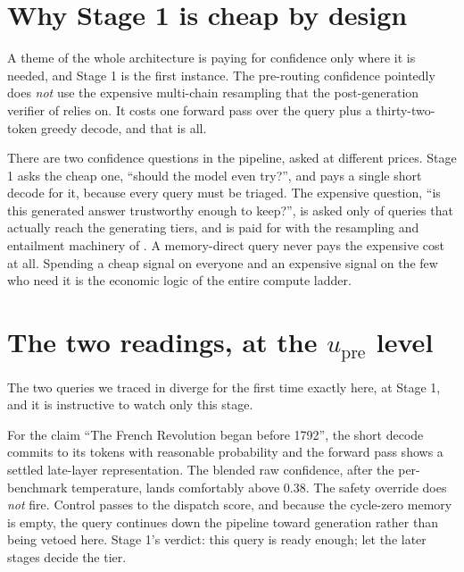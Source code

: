 \section{Why Stage 1 is cheap by design}
\label{sec:upre-cost}

A theme of the whole architecture is paying for confidence only where it is
needed, and Stage 1 is the first instance. The pre-routing confidence pointedly
does \emph{not} use the expensive multi-chain resampling that the post-generation
verifier of  relies on. It costs one forward pass over the query
plus a thirty-two-token greedy decode, and that is all.

\begin{intuition}
There are two confidence questions in the pipeline, asked at different prices.
Stage 1 asks the cheap one, ``should the model even try?'', and pays a single
short decode for it, because every query must be triaged. The expensive question,
``is this generated answer trustworthy enough to keep?'', is asked only of queries
that actually reach the generating tiers, and is paid for with the resampling and
entailment machinery of . A memory-direct query never pays the
expensive cost at all. Spending a cheap signal on everyone and an expensive signal
on the few who need it is the economic logic of the entire compute ladder.
\end{intuition}

\section{The two readings, at the $u_{\text{pre}}$ level}
\label{sec:upre-scenarios}

The two queries we traced in  diverge for the first time
exactly here, at Stage 1, and it is instructive to watch only this stage.

\begin{scenario}
For the claim ``The French Revolution began before 1792'', the short decode commits
to its tokens with reasonable probability and the forward pass shows a settled
late-layer representation. The blended raw confidence, after the per-benchmark
temperature, lands comfortably above $0.38$. The safety override does \emph{not}
fire. Control passes to the dispatch score, and because the cycle-zero memory is
empty, the query continues down the pipeline toward generation rather than being
vetoed here. Stage 1's verdict: this query is ready enough; let the later stages
decide the tier.
\end{scenario}

